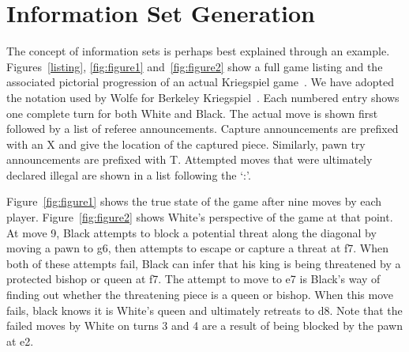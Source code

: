 \documentclass[10pt, conference, compsocconf]{IEEEtran}
\begin{document}
\section{Information Set Generation}
\label{info}
The concept of information sets is perhaps best explained through an example. 
Figures~\ref{listing}, \ref{fig:figure1} and~\ref{fig:figure2} show a full game listing and the associated pictorial progression of an actual
Kriegspiel game~\cite{li94chess}.  We have adopted the notation used by Wolfe for Berkeley Kriegspiel~\cite{wolfe07exploiting}.  Each numbered entry shows one complete turn for both White and Black.  The actual move is shown
first followed by a list of referee announcements.  Capture announcements are prefixed with an X and give the location
of the captured piece.  Similarly, pawn try announcements are prefixed with T.  Attempted moves that were ultimately
declared illegal are shown in a list following the `:'.  

Figure~\ref{fig:figure1} shows the true state of the game after nine moves by
each player.  Figure~\ref{fig:figure2} shows White's perspective of the game at
that point. At move 9, Black attempts to block a
potential threat along the diagonal by moving a pawn to g6, then attempts to
escape or capture a threat at f7.  When both of these attempts fail, Black can
infer that his king is being threatened by a protected bishop or queen at f7.
The attempt to move to e7 is Black's way of finding out whether the threatening
piece is a queen or bishop.  When this move fails, black knows it is White's
queen and ultimately retreats to d8.  Note that the failed moves by White on
turns 3 and 4 are a result of being blocked by the pawn at e2.
\end{document}
